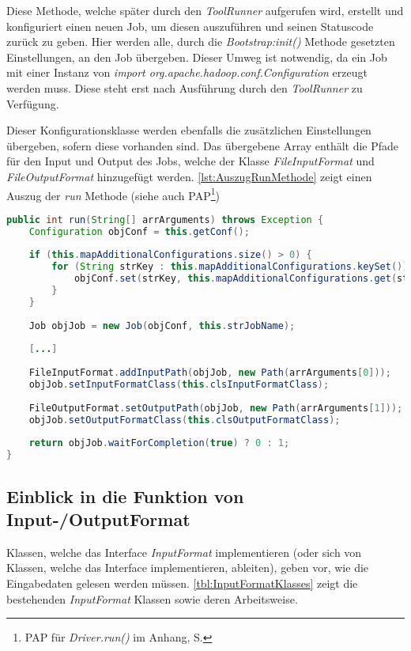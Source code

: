 Diese Methode, welche später durch den \textit{ToolRunner} aufgerufen wird, erstellt und konfiguriert einen neuen Job, um diesen auszuführen und seinen Statuscode zurück zu geben. Hier werden alle, durch die \textit{Bootstrap:init()} Methode gesetzten Einstellungen, an den Job übergeben. Dieser Umweg ist notwendig, da ein Job mit einer Instanz von \textit{import org.apache.hadoop.conf.Configuration} erzeugt werden muss. Diese steht erst nach Ausführung durch den \textit{ToolRunner} zu Verfügung.

Dieser Konfigurationsklasse werden ebenfalls die zusätzlichen Einstellungen übergeben, sofern diese vorhanden sind. Das übergebene Array enthält die Pfade für den Input und Output des Jobs, welche der Klasse \textit{FileInputFormat} und \textit{FileOutputFormat} hinzugefügt werden. \autoref{lst:AuszugRunMethode} zeigt einen Auszug der \textit{run} Methode (siehe auch \ac{PAP}\footnote{\ac{PAP} für \textit{Driver.run()} im Anhang, S. \pageref{subsec:PAPDriverRun}}) \\

\begin{lstlisting}[language=Java,caption=Auszug der \textit{run()} Methode,label=lst:AuszugRunMethode]
public int run(String[] arrArguments) throws Exception {
	Configuration objConf = this.getConf();
	
	if (this.mapAdditionalConfigurations.size() > 0) {
		for (String strKey : this.mapAdditionalConfigurations.keySet()) {
			objConf.set(strKey, this.mapAdditionalConfigurations.get(strKey));
		}
	}
	
	Job objJob = new Job(objConf, this.strJobName);
	
	[...]
	
	FileInputFormat.addInputPath(objJob, new Path(arrArguments[0]));
	objJob.setInputFormatClass(this.clsInputFormatClass);
	
	FileOutputFormat.setOutputPath(objJob, new Path(arrArguments[1]));
	objJob.setOutputFormatClass(this.clsOutputFormatClass);
	
	return objJob.waitForCompletion(true) ? 0 : 1;
}
\end{lstlisting}

\newpage
\subsection{Einblick in die Funktion von Input-/OutputFormat}
Klassen, welche das Interface \textit{InputFormat} implementieren (oder sich von Klassen, welche das Interface implementieren, ableiten), geben vor, wie die Eingabedaten gelesen werden müssen. \autoref{tbl:InputFormatKlasses} zeigt die bestehenden \textit{InputFormat} Klassen sowie deren Arbeitsweise.

